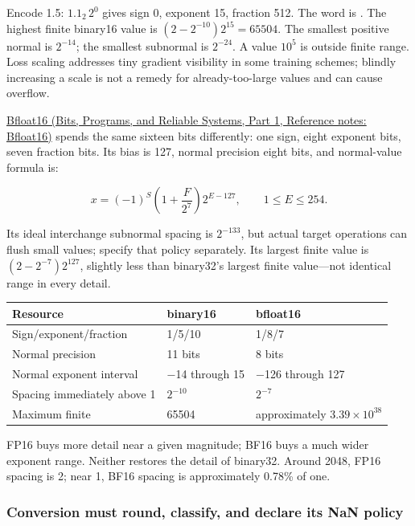 Encode 1.5: \(1.1_2\,2^0\) gives sign 0, exponent 15, fraction 512. The word is . The highest finite binary16 value is \((2-2^{-10})2^{15}=65504\). The smallest positive normal is \(2^{-14}\); the smallest subnormal is \(2^{-24}\). A value \(10^5\) is outside finite range. Loss scaling addresses tiny gradient visibility in some training schemes; blindly increasing a scale is not a remedy for already-too-large values and can cause overflow.

\href{../01-Bits-Programs-and-Reliable-Systems-P01/main.pdf\#nameddest=appendix-18b8dd966b5d}{Bfloat16 (Bits, Programs, and Reliable Systems, Part 1, Reference notes: Bfloat16)} spends the same sixteen bits differently: one sign, eight exponent bits, seven fraction bits. Its bias is 127, normal precision eight bits, and normal-value formula is:

\[
x=(-1)^S\left(1+\frac{F}{2^7}\right)2^{E-127},
\qquad1\le E\le254.
\]

Its ideal interchange subnormal spacing is \(2^{-133}\), but actual target operations can flush small values; specify that policy separately. Its largest finite value is \((2-2^{-7})2^{127}\), slightly less than binary32's largest finite value---not identical range in every detail.

{\def\LTcaptype{none} %
\begin{longtable}[]{@{}lll@{}}
\toprule\noalign{}
Resource & binary16 & bfloat16 \\
\midrule\noalign{}
\endhead
\bottomrule\noalign{}
\endlastfoot
Sign/exponent/fraction & 1/5/10 & 1/8/7 \\
Normal precision & 11 bits & 8 bits \\
Normal exponent interval & −14 through 15 & −126 through 127 \\
Spacing immediately above 1 & \(2^{-10}\) & \(2^{-7}\) \\
Maximum finite & 65504 & approximately \(3.39\times10^{38}\) \\
\end{longtable}
}

FP16 buys more detail near a given magnitude; BF16 buys a much wider exponent range. Neither restores the detail of binary32. Around 2048, FP16 spacing is 2; near 1, BF16 spacing is approximately 0.78\% of one.

\subsubsection{Conversion must round, classify, and declare its NaN policy}\label{05-engine-i-ch001-conversion-must-round-classify-and-declare-its-nan-policy}

